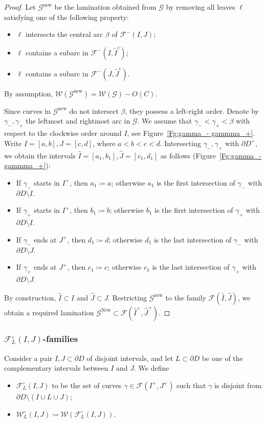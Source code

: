 \documentclass{amsart}
\newcommand{\1}{{\mathbb 1 }}
\newcommand{\FamG}{{\mathcal G}}
\newcommand{\Fam}{{\mathcal F}}
\newcommand{\Width}{{\mathcal W}}
\newcommand\new{{\operatorname{new}}}
\newcommand\New{{\operatorname{New}}}
\theoremstyle{remark}
\numberwithin{equation}{section}
\theoremstyle{definition}
\begin{document}
\begin{proof}
 Let $\FamG^\new$ be the lamination obtained from $\FamG$ by removing all leaves $\ell$ satisfying one of the following property:
\begin{itemize}
\item $\ell$ intersects the central arc $\beta$ of  $\Fam^-(I,J)$;
\item $\ell$ contains a subarc in $\Fam^-(I,\widetilde I^c)$;
\item $\ell$ contains a subarc in $\Fam^-(J,\widetilde J^c)$.
\end{itemize}
By assumption, $\Width(\FamG^\new) = \Width(\FamG)- O(C)$.


Since curves in $\FamG^\new$ do not intersect $\beta$, they possess a left-right order. Denote by $\gamma_-,\gamma_+$ the leftmost and rightmost arc in $\FamG$. We assume that $\gamma_-<\gamma_+<\beta$ with respect to the clockwise order around $I$, see Figure~\ref{Fg:gamma_- gammma_+}. Write $I=[a,b], J=[c,d]$, where $a<b<c<d$.  Intersecting $\gamma_-,\gamma_+$ with $\partial D^+$, we obtain the intervals $\widehat I =[a_1,b_1], \widehat J=[c_1,d_1]$ as follows (Figure~\ref{Fg:gamma_- gammma_+}):
\begin{itemize}
\item If $\gamma_-$ starts in $I^+$, then $a_1\coloneqq a$; otherwise $a_1$ is the first intersection of $\gamma_-$ with $\partial D\setminus I$.
\item If $\gamma_+$ starts in $I^+$, then $b_1\coloneqq b$; otherwise $b_1$ is the first intersection of $\gamma_+$ with $\partial D\setminus I$.
\item If $\gamma_-$ ends at $J^+$, then $d_1\coloneqq d$; otherwise $d_1$ is the last intersection of $\gamma_-$ with $\partial D\setminus J$.
\item If $\gamma_+$ ends at $J^+$, then $c_1\coloneqq c$; otherwise $c_1$ is the last intersection of $\gamma_+$ with $\partial D\setminus J$.
\end{itemize} 
By construction, $\widehat I\subset I$ and $\widehat J\subset J$. Restricting $\FamG^\new$ to the family $\Fam(\widehat I, \widehat J)$, we obtain a required lamination $\FamG^\New\subset \Fam(\widehat I^+, \widehat J^+).$ 
\end{proof}


\subsubsection{$\Fam^\circ_L(I,J)$-families}
\label{sss:Fam^circ}
Consider a pair $I,J\subset \partial D$ of disjoint intervals, and let $L\subset \partial D$ be one of the complementary intervals between $I$ and $J$. We define 
\begin{itemize}
\item $\Fam^\circ _L(I,J)$ to be the set of curves $\gamma\in \Fam (I^+,J^+)$ such that $\gamma$ is disjoint from $\partial D\setminus (I\cup L\cup J)$;
\item $\Width^\circ _L(I,J)\coloneqq \Width \left(\Fam^\circ _L(I,J) \right)$.
\end{itemize}
\end{document}
